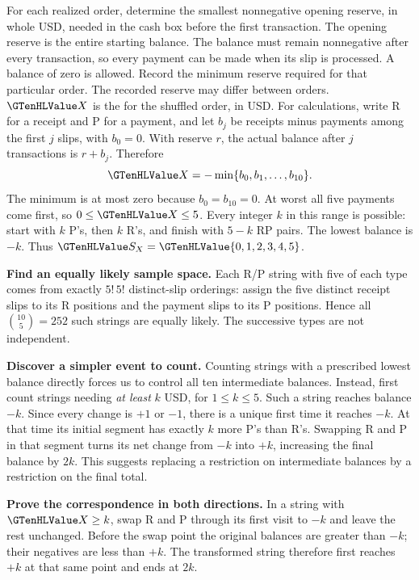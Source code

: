 For each realized order, determine the smallest nonnegative opening reserve, in whole USD, needed in the cash box before the first transaction. The opening reserve is the entire starting balance. The balance must remain nonnegative after every transaction, so every payment can be made when its slip is processed. A balance of zero is allowed. Record the minimum reserve required for that particular order. The recorded reserve may differ between orders.
$\cTwoValue{X}$ is the  for the shuffled order, in USD. For calculations, write R for a receipt and P for a payment, and let $b_j$ be receipts minus payments among the first $j$ slips, with $b_0=0$. With reserve $r$, the actual balance after $j$ transactions is $r+b_j$. Therefore
\[
\cTwoValue{X}=-\min\{b_0,b_1,\ldots,b_{10}\}.
\]
The minimum is at most zero because $b_0=b_{10}=0$. At worst all five payments come first, so $0\leq \cTwoValue{X}\leq5$. Every integer $k$ in this range is possible: start with $k$ P's, then $k$ R's, and finish with $5-k$ RP pairs. The lowest balance is $-k$. Thus $\cTwoValue{S_X}=\cTwoValue{\{0,1,2,3,4,5\}}$.

\textbf{Find an equally likely sample space.} Each R/P string with five of each type comes from exactly $5!\,5!$ distinct-slip orderings: assign the five distinct receipt slips to its R positions and the payment slips to its P positions. Hence all $\binom{10}{5}=252$ such strings are equally likely. The successive types are not independent.

\textbf{Discover a simpler event to count.} Counting strings with a prescribed lowest balance directly forces us to control all ten intermediate balances. Instead, first count strings needing \emph{at least} $k$ USD, for $1\leq k\leq5$. Such a string reaches balance $-k$. Since every change is $+1$ or $-1$, there is a unique first time it reaches $-k$. At that time its initial segment has exactly $k$ more P's than R's. Swapping R and P in that segment turns its net change from $-k$ into $+k$, increasing the final balance by $2k$. This suggests replacing a restriction on intermediate balances by a restriction on the final total.

\textbf{Prove the correspondence in both directions.} In a string with $\cTwoValue{X}\geq k$, swap R and P through its first visit to $-k$ and leave the rest unchanged. Before the swap point the original balances are greater than $-k$; their negatives are less than $+k$. The transformed string therefore first reaches $+k$ at that same point and ends at $2k$.

